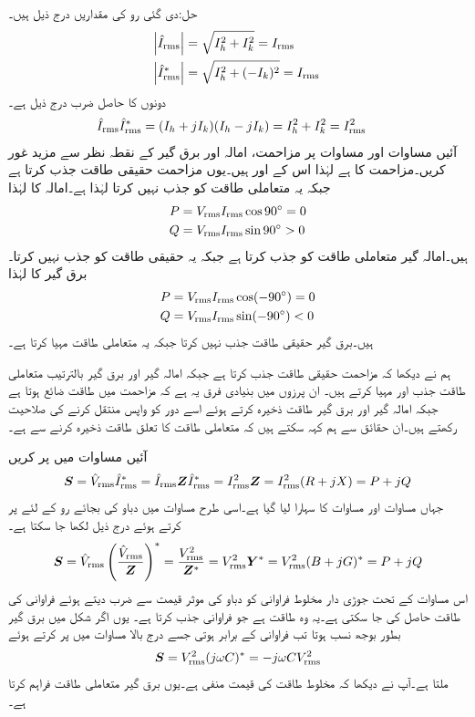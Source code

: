 حل:دی گئی رو کی مقداریں درج ذیل ہیں۔
\begin{align*}
\abs{{\hat{I}_{\textup{rms}}}}&=\sqrt{I_h^2+I_k^2}={I_{\textup{rms}}}\\
\abs{{\hat{I}^{*}_{\textup{rms}}}}&=\sqrt{I_h^2+(-I_k)^2}={I_{\textup{rms}}}
\end{align*}
دونوں  کا حاصل ضرب درج ذیل ہے۔
\begin{align}\label{مساوات_طاقت_مقدار_مساوی_مخلوط_اور_جوڑی_دور_ضرب}
{\ensuremath{\hat{I}_{\textup{rms}}}}{\ensuremath{\hat{I}^{*}_{\textup{rms}}}}&=(I_h+jI_k)(I_h-jI_k)=I_h^2+I_k^2={I^2_{\textup{rms}}}
\end{align}
آئیں مساوات  اور مساوات  پر مزاحمت، امالہ اور برق گیر کے نقطہ نظر سے مزید غور کریں۔مزاحمت کا  ہے لہٰذا اس کے  اور  ہیں۔یوں مزاحمت حقیقی طاقت جذب  کرتا ہے جبکہ یہ متعاملی طاقت کو جذب نہیں کرتا لہٰذا  ہے۔امالہ کا   لہٰذا
\begin{align}
P&={V_{\textup{rms}}} {I_{\textup{rms}}} \cos 90^{\circ}=0\\
Q&={V_{\textup{rms}}} {I_{\textup{rms}}} \sin 90^{\circ}>0
\end{align}
ہیں۔امالہ گیر متعاملی طاقت کو جذب کرتا ہے جبکہ یہ حقیقی طاقت کو جذب نہیں کرتا۔برق گیر کا  لہٰذا
\begin{align}
P&={V_{\textup{rms}}} {I_{\textup{rms}}} \cos (-90^{\circ})=0\\
Q&={V_{\textup{rms}}} {I_{\textup{rms}}} \sin (-90^{\circ})<0
\end{align}
ہیں۔برق گیر حقیقی طاقت جذب نہیں کرتا جبکہ یہ متعاملی طاقت مہیا کرتا ہے۔

ہم نے دیکھا کہ مزاحمت حقیقی طاقت جذب کرتا ہے جبکہ امالہ گیر اور برق گیر بالترتیب متعاملی طاقت جذب اور مہیا کرتے ہیں۔ ان پرزوں میں بنیادی فرق یہ ہے کہ مزاحمت میں طاقت ضائع ہوتا ہے جبکہ امالہ گیر اور برق گیر طاقت ذخیرہ کرتے ہوئے اسے دور کو واپس منتقل کرنے کی صلاحیت رکھتے ہیں۔ان حقائق سے ہم کہہ سکتے ہیں کہ متعاملی طاقت کا تعلق طاقت ذخیرہ کرنے سے  ہے۔  

آئیں مساوات  میں  پر کریں
\begin{align}
{\ensuremath{{\boldsymbol{S}}}}={\hat{V}_{\textup{rms}}}{\hat{I}^{*}_{\textup{rms}}}={\hat{I}_{\textup{rms}}}{{\boldsymbol{Z}}}{\hat{I}^{*}_{\textup{rms}}}={I^2_{\textup{rms}}}{{\boldsymbol{Z}}}={I^2_{\textup{rms}}}(R+jX)=P+jQ
\end{align}
جہاں مساوات  اور مساوات  کا سہارا لیا گیا ہے۔اسی طرح مساوات  میں دباو کی بجائے رو کے لئے پر کرتے ہوئے درج ذیل لکھا جا سکتا ہے۔
\begin{align}
{\ensuremath{{\boldsymbol{S}}}}={\hat{V}_{\textup{rms}}}\left(\frac{{\hat{V}_{\textup{rms}}}}{{{\boldsymbol{Z}}}}\right)^*=\frac{{V^2_{\textup{rms}}}}{{{\boldsymbol{Z}}^{*}}}={V^2_{\textup{rms}}} {{\boldsymbol{Y}}^{*}}={V^2_{\textup{rms}}}(B+jG)^*=P+jQ
\end{align}
اس مساوات کے تحت جوڑی دار مخلوط فراوانی کو دباو کی موثر قیمت سے ضرب دیتے ہوئے فراوانی کی طاقت حاصل کی جا سکتی ہے۔یہ وہ طاقت ہے جو فراوانی جذب کرتا ہے۔  یوں اگر شکل  میں برق گیر بطور بوجھ  نسب ہوتا تب فراوانی  کے برابر ہوتی جسے درج بالا مساوات میں پر کرتے ہوئے
\begin{align*}
{\ensuremath{{\boldsymbol{S}}}}={V^2_{\textup{rms}}} (j\omega C)^*=-j\omega C {V^2_{\textup{rms}}}
\end{align*}
ملتا ہے۔آپ نے دیکھا کہ مخلوط طاقت کی قیمت منفی ہے۔یوں برق گیر متعاملی طاقت فراہم کرتا ہے۔

